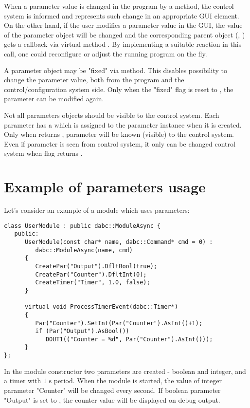 When a parameter value is changed in the program by a  method, 
the control system is informed and represents such change in an appropriate GUI element.
On the other hand, if the user modifies a parameter value in the GUI, 
the value of the parameter object will be changed and the corresponding parent object 
(, ) gets a callback via 
virtual method . 
By implementing a suitable reaction in this call, 
one could reconfigure or adjust the running program on the fly.

A parameter object may be "fixed" via  method. 
This disables possibility to change the parameter value, both
from the program and the control/configuration system side. 
Only when the "fixed" flag is reset to ,
the parameter can be modified again.

Not all parameters objects should be visible to the control system. 
Each parameter has a  
which is assigned to the parameter instance when it is created.
Only when  returns , parameter will be  
known (visible) to the control system. Even if parameter is seen
from control system, it only can be changed  control system 
when flag  returns . 


\section{Example of parameters usage}
\label{prog_setup_parameterexample}
Let's consider an example of a module which uses parameters:

\begin{verbatim}
class UserModule : public dabc::ModuleAsync {
   public:
      UserModule(const char* name, dabc::Command* cmd = 0) : 
         dabc::ModuleAsync(name, cmd)
      {
         CreatePar("Output").DfltBool(true);
         CreatePar("Counter").DfltInt(0);
         CreateTimer("Timer", 1.0, false);
      }
      
      virtual void ProcessTimerEvent(dabc::Timer*)
      {
         Par("Counter").SetInt(Par("Counter").AsInt()+1);
         if (Par("Output").AsBool()) 
            DOUT1(("Counter = %d", Par("Counter").AsInt()));
      }
}; 
\end{verbatim}

In the module constructor two parameters are created - boolean and integer, 
and a timer with $1\mbox{~s}$ period.
When the module is started, the value of integer parameter "Counter" 
will be changed every second.
If boolean parameter "Output" is set to , 
the counter value will be displayed on debug output.

